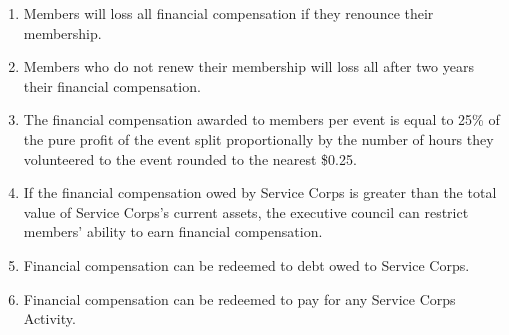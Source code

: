 \documentclass{Service_Corps_Document}
\begin{document}
    \def \Title {Financial Compensation}
    \def \Company {Service Corps}
    \def \versionNumber {1.0}
    \stdFooter
    \begin{titlepage}
        \stdTitlePage
    \end{titlepage}

    \tableofcontents

    \newpage
    \begin{enumerate}
        \item Members will loss all financial compensation if they renounce their membership.
        \item Members who do not renew their membership will loss all after two years their financial compensation.
        \item The financial compensation awarded to members per event is equal to 25\% of the pure profit of the event split proportionally by the number of hours they volunteered to the event rounded to the nearest \$0.25.
        \item If the financial compensation owed by Service Corps is greater than the total value of Service Corps's current assets, the executive council can restrict members' ability to earn financial compensation.
        \item Financial compensation can be redeemed to debt owed to Service Corps.
        \item Financial compensation can be redeemed to pay for any Service Corps Activity.
    \end{enumerate}
\end{document}
